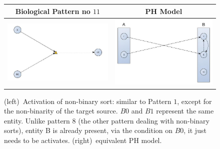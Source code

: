 \documentclass[11pt,a4paper,twoside]{epig}
\begin{document}
\begin{figure}[ht]
\begin{tabular}{|c|c|}
\hline
Biological Pattern no $11$ & PH Model \\
\hline
  \includegraphics[scale=0.28]{./imagesannexe/phdrawings/11cyt.jpg} & \includegraphics[scale=0.15]{./imagesannexe/phdrawings/11ph.jpg} \\
 \hline
\end{tabular}
\caption{\label{fig:pattern:11}
(left)~Activation of non-binary sort: similar to Pattern $1$, except for the non-binarity of the target source.
$B0$ and $B1$ represent the same entity. Unlike pattern $8$ (the other pattern dealing with non-binary sorts),
entity B is already present, via the condition on $B0$, it just needs to be activates.
(right)~equivalent PH model. 
}
\end{figure}



\clearpage
\end{document}
